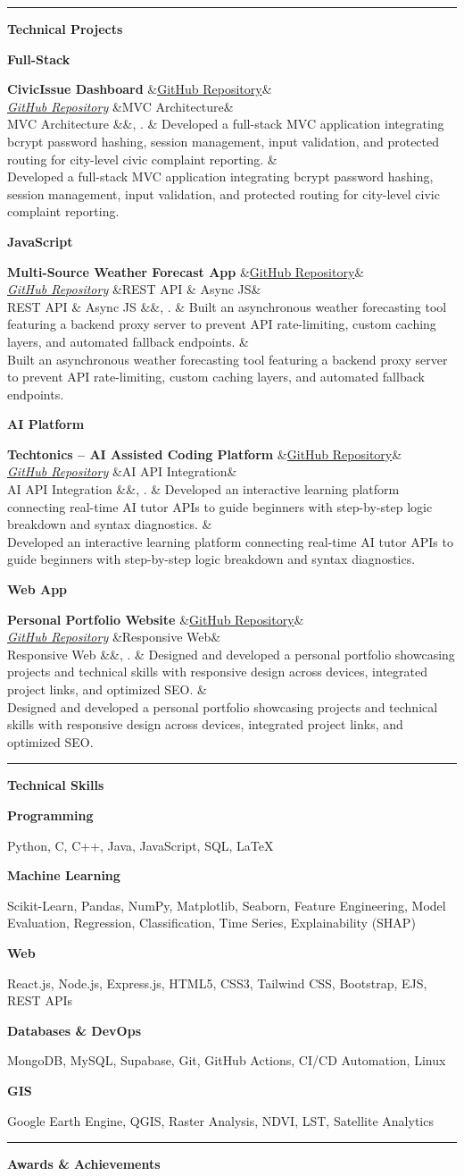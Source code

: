 \documentclass[11pt,a4paper]{article}
\newlength{\hintscolumnwidth}
\newlength{\separatorcolumnwidth}
\newlength{\maincolumnwidth}
\newcommand{\cvsection}[1]{%
  \par\vspace{10pt}%
  \needspace{5\baselineskip}%
  \phantomsection
  \noindent
  \begin{minipage}[t]{\hintscolumnwidth}
    \raggedleft
    \color{cvblue}\rule[0.3ex]{\linewidth}{3.5pt}%
  \end{minipage}%
  \hspace{\separatorcolumnwidth}%
  \begin{minipage}[t]{\maincolumnwidth}
    {\raggedright\fontsize{12.5}{14.5}\selectfont\bfseries\color{cvblue} #1}
  \end{minipage}%
  \par\nopagebreak\vspace{5pt}\nopagebreak%
}
\newcommand{\cvitem}[2]{%
  \vspace{3pt}%
  \noindent
  \begin{minipage}[t]{\hintscolumnwidth}
    \raggedleft\small\bfseries\color{cvdark} #1
  \end{minipage}%
  \hspace{\separatorcolumnwidth}%
  \begin{minipage}[t]{\maincolumnwidth}
    \raggedright\sloppy\color{cvdark} #2
  \end{minipage}%
  \par\vspace{3pt}%
}
\newcommand{\cventry}[6]{%
  \vspace{4pt}%
  \noindent
  \begin{minipage}[t]{\hintscolumnwidth}
    \raggedleft\small\bfseries\color{cvdark} #1
  \end{minipage}%
  \hspace{\separatorcolumnwidth}%
  \begin{minipage}[t]{\maincolumnwidth}
    \raggedright\sloppy
    {\bfseries #2}%
    \ifx&#3&\else\\[1.5pt]\textit{#3}\fi%
    \ifx&#4&\else\\[1.5pt]#4\fi%
    \ifx&#5&\else, #5\fi.%
    \ifx&#6&\else\\[2.5pt]{\color{cvdark} #6}\fi
  \end{minipage}%
  \par\vspace{4pt}%
}
\begin{document}
\cvsection{Technical Projects}

\cventry{Full-Stack}{CivicIssue Dashboard}{\href{https://github.com/SAPTARSHI-coder/civicissue-dashboard}{GitHub Repository}}{MVC Architecture}{}{%
Developed a full-stack MVC application integrating bcrypt password hashing, session management, input validation, and protected routing for city-level civic complaint reporting.
}

\cventry{JavaScript}{Multi-Source Weather Forecast App}{\href{https://github.com/SAPTARSHI-coder/Weather-App}{GitHub Repository}}{REST API \& Async JS}{}{%
Built an asynchronous weather forecasting tool featuring a backend proxy server to prevent API rate-limiting, custom caching layers, and automated fallback endpoints.
}

\cventry{AI Platform}{Techtonics -- AI Assisted Coding Platform}{\href{https://github.com/SAPTARSHI-coder/Techtonics}{GitHub Repository}}{AI API Integration}{}{%
Developed an interactive learning platform connecting real-time AI tutor APIs to guide beginners with step-by-step logic breakdown and syntax diagnostics.
}

\cventry{Web App}{Personal Portfolio Website}{\href{https://github.com/SAPTARSHI-coder/Portfolio}{GitHub Repository}}{Responsive Web}{}{%
Designed and developed a personal portfolio showcasing projects and technical skills with responsive design across devices, integrated project links, and optimized SEO.
}

\cvsection{Technical Skills}

\cvitem{Programming}{Python, C, C++, Java, JavaScript, SQL, LaTeX}
\cvitem{Machine Learning}{Scikit-Learn, Pandas, NumPy, Matplotlib, Seaborn, Feature Engineering, Model Evaluation, Regression, Classification, Time Series, Explainability (SHAP)}
\cvitem{Web}{React.js, Node.js, Express.js, HTML5, CSS3, Tailwind CSS, Bootstrap, EJS, REST APIs}
\cvitem{Databases \& DevOps}{MongoDB, MySQL, Supabase, Git, GitHub Actions, CI/CD Automation, Linux}
\cvitem{GIS}{Google Earth Engine, QGIS, Raster Analysis, NDVI, LST, Satellite Analytics}

\cvsection{Awards \& Achievements}
\end{document}
